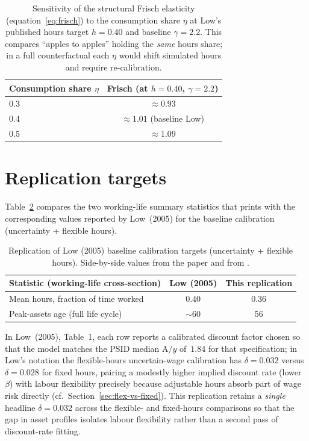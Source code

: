 \documentclass[titlepage, headings=optiontotocandhead]{econark} %
\begin{document}
\begin{table}[htbp]
  \centering
  \caption{Sensitivity of the structural Frisch elasticity
  (equation~\eqref{eq:frisch}) to the consumption share $\eta$ at Low's
  published hours target $h = 0.40$ and baseline $\gamma = 2.2$.  This
  compares ``apples to apples'' holding the \emph{same} hours share;
  in a full counterfactual each $\eta$ would shift simulated hours and
  require re-calibration.}
  \label{tab:frisch-eta}
  \begin{tabular}{lc}
    \toprule
    Consumption share $\eta$ & Frisch (at $h = 0.40$, $\gamma = 2.2$) \\
    \midrule
    0.3 & $\approx 0.93$ \\
    0.4 & $\approx 1.01$ \quad (baseline Low) \\
    0.5 & $\approx 1.09$ \\
    \bottomrule
  \end{tabular}
\end{table}

\section{Replication targets}\label{sec:replication-targets}

Table~\ref{tab:replication-targets} compares the two working-life summary
statistics that  prints with the corresponding
values reported by Low~(2005) for the baseline calibration
(uncertainty + flexible hours).

\begin{table}[htbp]
  \centering
  \caption{Replication of Low (2005) baseline calibration targets
  (uncertainty + flexible hours). Side-by-side values from the paper and
  from .}
  \label{tab:replication-targets}
  \begin{tabular}{lcc}
    \toprule
    Statistic (working-life cross-section) & Low (2005) & This replication \\
    \midrule
    Mean hours, fraction of time worked & 0.40 & 0.36 \\
    Peak-assets age (full life cycle) & $\sim$60 & 56 \\
    \bottomrule
  \end{tabular}
\end{table}

In Low~(2005), Table~1, each row reports a calibrated discount factor
chosen so that the model matches the PSID median $\mathrm{A}/y$
of~$1.84$ for that specification; in Low's notation the flexible-hours
uncertain-wage calibration has $\delta = 0.032$ versus $\delta =
0.028$ for fixed hours, pairing a modestly higher implied discount rate
(lower $\beta$) with labour flexibility precisely because adjustable
hours absorb part of wage risk directly (cf.\ Section~\ref{sec:flex-vs-fixed}).
This replication retains a \emph{single} headline $\delta = 0.032$ across the
flexible- and fixed-hours comparisons so that the gap in asset profiles
isolates labour flexibility rather than a second pass of discount-rate
fitting.
\end{document}
